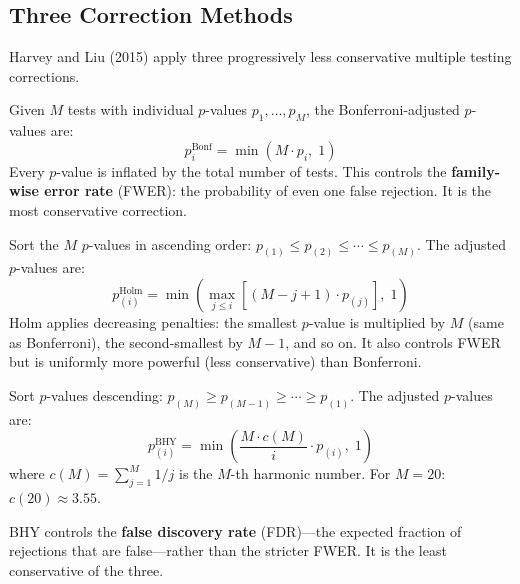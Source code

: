 \subsection{Three Correction Methods}

Harvey and Liu (2015) apply three progressively less conservative multiple testing corrections.

\begin{definition}
Given $M$ tests with individual $p$-values $p_1, \ldots, p_M$, the Bonferroni-adjusted $p$-values are:
\begin{equation}
p_i^{\text{Bonf}} = \min(M \cdot p_i, \; 1)
\label{eq:bonferroni}
\end{equation}
Every $p$-value is inflated by the total number of tests. This controls the \textbf{family-wise error rate} (FWER): the probability of even one false rejection. It is the most conservative correction.
\end{definition}

\begin{definition}
Sort the $M$ $p$-values in ascending order: $p_{(1)} \leq p_{(2)} \leq \cdots \leq p_{(M)}$. The adjusted $p$-values are:
\begin{equation}
p_{(i)}^{\text{Holm}} = \min\!\left(\max_{j \leq i}\!\left[(M - j + 1) \cdot p_{(j)}\right], \; 1\right)
\label{eq:holm}
\end{equation}
Holm applies decreasing penalties: the smallest $p$-value is multiplied by $M$ (same as Bonferroni), the second-smallest by $M - 1$, and so on. It also controls FWER but is uniformly more powerful (less conservative) than Bonferroni.
\end{definition}

\begin{definition}
Sort $p$-values descending: $p_{(M)} \geq p_{(M-1)} \geq \cdots \geq p_{(1)}$. The adjusted $p$-values are:
\begin{equation}
p_{(i)}^{\text{BHY}} = \min\!\left(\frac{M \cdot c(M)}{i} \cdot p_{(i)}, \; 1\right)
\label{eq:bhy}
\end{equation}
where $c(M) = \sum_{j=1}^{M} 1/j$ is the $M$-th harmonic number. For $M = 20$: $c(20) \approx 3.55$.

BHY controls the \textbf{false discovery rate} (FDR)---the expected fraction of rejections that are false---rather than the stricter FWER. It is the least conservative of the three.
\end{definition}

